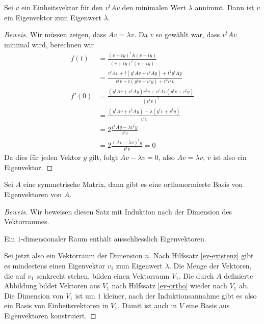 \begin{hilfssatz}
\label{ev-existenz}
Sei $v$ ein Einheitsvektor für den $v^tAv$ den minimalen Wert $\lambda$ annimmt.
Dann ist $v$ ein Eigenvektor zum Eigenwert $\lambda$.
\end{hilfssatz}

\begin{proof}[Beweis]
Wir müssen zeigen, dass $Av=\lambda v$.
Da $v$ so gewählt war, dass $v^tAv$ minimal wird, berechnen wir 
\begin{align*}
f(t)&=\frac{(v+ty)^tA(v+ty)}{(v+ty)^t(v+ty)}
\\
&=
\frac{v^tAv+t(y^tAv+v^tAy)+t^2y^tAy}{v^tv+t(y^tv+v^ty)+t^2v^tv}
\\
f'(0)
&=
\frac{ (y^tAv+v^tAy)v^tv + v^tAv(y^tv+v^ty) }{ (v^tv)^2 }
\\
&=
\frac{ (y^tAv+v^tAy) - \lambda (y^tv+v^ty) }{ v^tv }
\\
&=
2\frac{ v^tAy - \lambda v^ty }{ v^tv }
\\
&=
2\frac{ (Av - \lambda v)^ty }{ v^tv }=0
\end{align*}
Da dies für jeden Vektor $y$ gilt, folgt $Av-\lambda v=0$, also
$Av=\lambda v$, $v$ ist also ein Eigenvektor.
\end{proof}

\begin{satz}
\label{satz:symmetrischdiagonalisierbar}
Sei $A$ eine symmetrische Matrix, dann gibt es eine orthonormierte Basis
von Eigenvektoren von $A$.
\end{satz}

\begin{proof}[Beweis]
Wir beweisen diesen Satz mit Induktion nach der Dimension des Vektorraumes.

Ein $1$-dimensionaler Raum enthält ausschliesslich Eigenvektoren.

Sei jetzt also ein Vektorraum der Dimension $n$.
Nach Hilfssatz \ref{ev-existenz} gibt es mindestens einen Eigenvektor $v_1$
zum Eigenwert $\lambda$.
Die Menge der Vektoren, die auf $v_1$ senkrecht
stehen, bilden einen Vektorraum $V_1$.
Die durch $A$ definierte Abbildung
bildet Vektoren aus $V_1$ nach Hilfssatz \ref{ev-ortho} wieder nach
$V_1$ ab.
Die Dimension von $V_1$ ist um $1$ kleiner, nach der
Induktionsannahme gibt es also ein Basis von Einheitsvektoren in $V_1$.
Damit ist auch in $V$ eine Basis aus Eigenvektoren konstruiert.
\end{proof}


